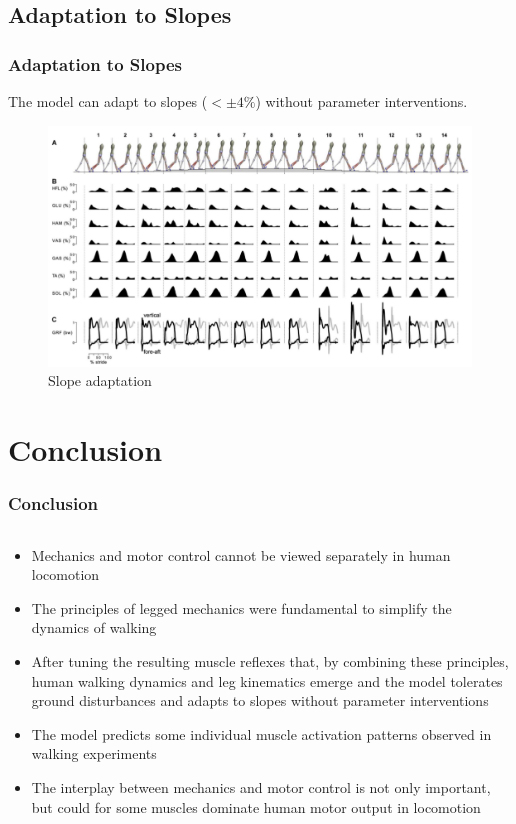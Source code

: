 \documentclass[10pt]{beamer}
\begin{document}
\subsection[Results]{Adaptation to Slopes}

\begin{frame}
	\frametitle{Adaptation to Slopes}
	
	The model can adapt to slopes ($ < \pm 4\% $) without parameter interventions.
	
	\begin{figure}
		\centering
		\includegraphics[height=.65\textheight]{images/slope_adaptation.pdf}
		\caption{Slope adaptation}	
	\end{figure}
	
\end{frame}

\section{Conclusion}	
\begin{frame}
	\frametitle{Conclusion}

	\begin{columns}
		\begin{column}{1.0\textwidth}
			\begin{itemize}
				\item Mechanics and motor control cannot be viewed separately in human locomotion
				\item The principles of legged mechanics were fundamental to simplify the dynamics of walking
				\item After tuning the resulting muscle reflexes that, by combining these principles, human walking dynamics and leg kinematics emerge and the model tolerates ground disturbances and adapts to slopes without parameter interventions
				\item The model predicts some individual muscle activation patterns observed in walking experiments
				\item The interplay between mechanics and motor control is not only important, but could for some muscles dominate human motor output in locomotion
			\end{itemize}
		\end{column}
	\end{columns}
\end{frame}
\end{document}
